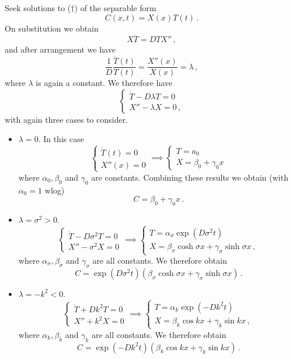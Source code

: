 \documentclass{article}
\theoremstyle{plain}\theoremheaderfont{\normalfont\itshape}\theorembodyfont{\rmfamily}\theoremseparator{.}\newtheorem*{rem}{Remark}\newtheorem*{ex}{Example}\newtheorem*{proof}{Proof}\newtheorem*{altp}{Alternative proof}
\theoremstyle{plain}\theoremheaderfont{\normalfont\bfseries}\theorembodyfont{\rmfamily}\theoremseparator{.}\newtheorem{thm}{Theorem}[section]\newtheorem{lem}[thm]{Lemma}\newtheorem{prop}[thm]{Proposition}\newtheorem*{cor}{Corollary}\newtheorem{defn}[thm]{Definition}\newtheorem{clm}[thm]{Claim}\newtheorem{clminproof}{Claim}
\theoremstyle{break}\theoremheaderfont{\normalfont\itshape}\theorembodyfont{\rmfamily}\theoremseparator{.\medskip}\newtheorem*{proofskip}{Proof}\newtheorem*{exs}{Examples}\newtheorem*{rems}{Remarks}
\theoremstyle{break}\theoremheaderfont{\normalfont\bfseries}\theorembodyfont{\rmfamily}\theoremseparator{.\medskip}\newtheorem{lemskip}[thm]{Lemma}\newtheorem{defnskip}[thm]{Definition}\newtheorem{propskip}[thm]{Proposition}\newtheorem{thmskip}[thm]{Theorem}
\numberwithin{equation}{section}
\begin{document}
	Seek solutions to (\(\dagger\)) of the separable form
	\[C(x,t)=X(x)T(t)\,.\]
	On substitution we obtain
	\[X\dot{T}=DTX''\,,\]
	and after arrangement we have
	\[\frac{1}{D}\frac{\dot{T}(t)}{T(t)}=\frac{X''(x)}{X(x)}=\lambda\,,\]
	where \(\lambda\) is again a constant. We therefore have
	\[\begin{cases}
		\dot{T}-D\lambda T=0\\
		X''-\lambda X=0\,,
	\end{cases}\]
	with again three cases to consider.
	\begin{itemize}[topsep=0pt]
		\item \(\lambda=0\). In this case
		\[\begin{cases}
			\dot{T}(t)=0\\
			X''(x)=0
		\end{cases}\implies\begin{cases}
			T=a_0\\
			X=\beta_0+\gamma_0 x
		\end{cases}\]
		where \(\alpha_0,\beta_0\) and \(\gamma_0\) are constants. Combining these results we obtain (with \(\alpha_0=1\) wlog)
		\[C=\beta_0+\gamma_0 x\,.\]

		\item \(\lambda=\sigma^2>0\).
		\[\begin{cases}
			\dot{T}-D\sigma^2T=0\\
			X''-\sigma^2X=0
		\end{cases}\implies\begin{cases}
			T=\alpha_\sigma\exp(D\sigma^2 t)\\
			X=\beta_\sigma\cosh\sigma x+\gamma_\sigma\sinh\sigma x\,,
		\end{cases}\]
		where \(\alpha_\sigma,\beta_\sigma\) and \(\gamma_\sigma\) are all constants. We therefore obtain
		\[C=\exp(D\sigma^2 t)(\beta_\sigma\cosh\sigma x+\gamma_\sigma\sinh\sigma x)\,.\]

		\item \(\lambda=-k^2<0\).
		\[\begin{cases}
			\dot{T}+Dk^2T=0\\
			X''+k^2X=0
		\end{cases}\implies\begin{cases}
			T=\alpha_k\exp(-Dk^2 t)\\
			X=\beta_k\cos kx+\gamma_k\sin kx\,,
		\end{cases}\]
		where \(\alpha_k,\beta_k\) and \(\gamma_k\) are all constants. We therefore obtain
		\[C=\exp(-Dk^2 t)(\beta_k\cos kx+\gamma_k\sin kx)\,.\]
	\end{itemize}
	
\end{document}
